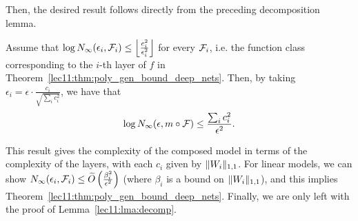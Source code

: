 Then, the desired result follows directly from the preceding decomposition lemma.
\begin{corollary} Assume that $\log N_\infty(\epsilon_i, \mathcal F_i) \leq \left \lfloor \frac{c_i^2}{\epsilon_i^2} \right \rfloor$ for every $\mathcal F_i$, i.e. the function class corresponding to the $i$-th layer of $f$ in Theorem~\ref{lec11:thm:poly_gen_bound_deep_nets}. Then, by taking $\epsilon_i = \epsilon \cdot \frac{c_i}{\sqrt{\sum_i c_i^2}}$, we have that
\begin{equation}
    \log N_\infty(\epsilon, m \circ \mathcal F) \leq \frac{\sum_i c_i^2}{\epsilon^2}.
\end{equation}
\end{corollary}
This result gives the complexity of the composed model in terms of the complexity of the layers, with each $c_i$ given by $\|W_i\|_{1, 1}$. For linear models, we can show $N_\infty(\epsilon_i, \mathcal F_i) \leq \widetilde{O}\left (\frac{\beta_i^2}{\epsilon^2} \right )$ (where $\beta_i$ is a bound on $\|W_i\|_{1, 1}$), and this implies Theorem~\ref{lec11:thm:poly_gen_bound_deep_nets}. Finally, we are only left with the proof of Lemma~\ref{lec11:lma:decomp}. 

